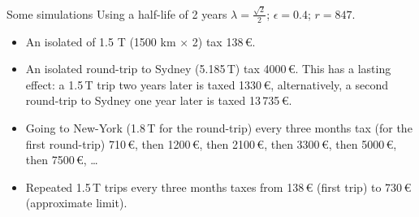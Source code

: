 \documentclass[french, english]{beamer}
\begin{document}
\begin{frame}{Some simulations}
    Using a half-life of 2 years $\lambda = \frac{\sqrt{2}}{2}$; $\epsilon = 0.4$; $r = 847$.
    \begin{itemize}
    	\item An isolated of 1.5 T (1500 km × 2) \textrightarrow{} tax 138\,€.
	\item An isolated round-trip to Sydney (5.185\,T) \textrightarrow{} tax 4000\,€. This has a lasting effect: a 1.5\,T trip two years later is taxed 1330\,€, alternatively, a second round-trip to Sydney one year later is taxed 13\,735\,€.
	\item Going to New-York (1.8\,T for the round-trip) every three months \textrightarrow{} tax (for the first round-trip) 710\,€, then 1200\,€, then 2100\,€, then 3300\,€, then 5000\,€, then 7500\,€, …
	\item Repeated 1.5\,T trips every three months \textrightarrow{} taxes from 138\,€ (first trip) to 730\,€ (approximate limit).
	\end{itemize}
\end{frame}
\end{document}
